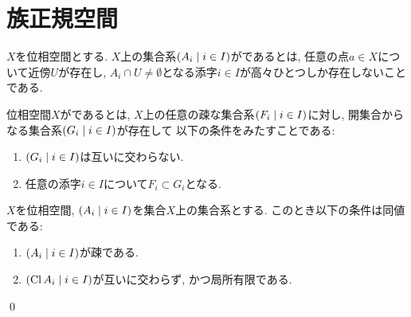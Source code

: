 \documentclass[uplatex, dvipdfmx, a4paper, 12pt, class=jsbook, crop=false]{standalone}
\begin{document}
\section{族正規空間}
\label{sec:collectionwise-normal-spaces}

\begin{definition}
    \(X\)を位相空間とする.
    \(X\)上の集合系\(\setfamily{A_i}{i \in I}\)がであるとは,
    任意の点\(a \in X\)について近傍\(U\)が存在し,
    \(A_i \cap U \neq \emptyset\)となる添字\(i \in I\)が高々ひとつしか存在しないことである.
\end{definition}

\begin{definition}
    位相空間\(X\)がであるとは,
    \(X\)上の任意の疎な集合系\(\setfamily{F_i}{i \in I}\)に対し,
    開集合からなる集合系\(\setfamily{G_i}{i \in I}\)が存在して
    以下の条件をみたすことである:
    \begin{enumerate}
        \item \(\setfamily{G_i}{i \in I}\)は互いに交わらない.
        \item 任意の添字\(i \in I\)について\(F_i \subset G_i\)となる.
    \end{enumerate}
\end{definition}

\begin{proposition}
    \(X\)を位相空間,
    \(\setfamily{A_i}{i \in I}\)を集合\(X\)上の集合系とする.
    このとき以下の条件は同値である:
    \begin{enumerate}
        \item \(\setfamily{A_i}{i \in I}\)が疎である.
        \item \(\setfamily{\topcl{A_i}}{i \in I}\)が互いに交わらず, かつ局所有限である.
    \end{enumerate}
    \qed
\end{proposition}
\end{document}
